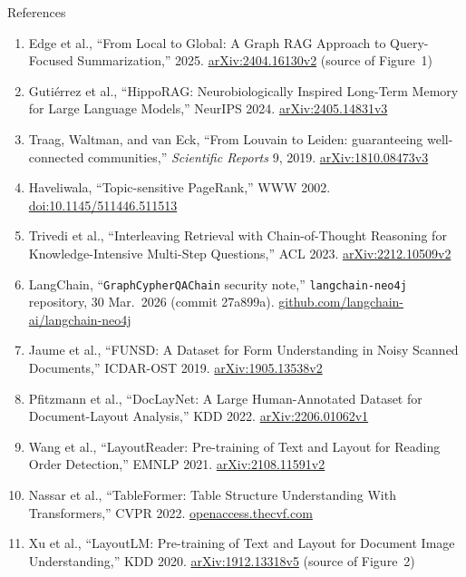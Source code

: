 \begin{frame}[allowframebreaks]{References}
\begin{enumerate}
    \item Edge et al., ``From Local to Global: A Graph RAG Approach to Query-Focused Summarization,'' 2025. \href{https://arxiv.org/abs/2404.16130v2}{arXiv:2404.16130v2} (source of Figure~1)
    \item Guti\'errez et al., ``HippoRAG: Neurobiologically Inspired Long-Term Memory for Large Language Models,'' NeurIPS 2024. \href{https://arxiv.org/abs/2405.14831v3}{arXiv:2405.14831v3}
    \item Traag, Waltman, and van Eck, ``From Louvain to Leiden: guaranteeing well-connected communities,'' \textit{Scientific Reports} 9, 2019. \href{https://arxiv.org/abs/1810.08473v3}{arXiv:1810.08473v3}
    \item Haveliwala, ``Topic-sensitive PageRank,'' WWW 2002. \href{https://doi.org/10.1145/511446.511513}{doi:10.1145/511446.511513}
    \item Trivedi et al., ``Interleaving Retrieval with Chain-of-Thought Reasoning for Knowledge-Intensive Multi-Step Questions,'' ACL 2023. \href{https://arxiv.org/abs/2212.10509v2}{arXiv:2212.10509v2}
    \item LangChain, ``\texttt{GraphCypherQAChain} security note,'' \texttt{langchain-neo4j} repository, 30 Mar.\ 2026 (commit 27a899a). \href{https://github.com/langchain-ai/langchain-neo4j/blob/27a899a1da724968774fcc7cd07734591c57e01d/libs/neo4j/langchain_neo4j/chains/graph_qa/cypher.py}{github.com/langchain-ai/langchain-neo4j}
    \item Jaume et al., ``FUNSD: A Dataset for Form Understanding in Noisy Scanned Documents,'' ICDAR-OST 2019. \href{https://arxiv.org/abs/1905.13538v2}{arXiv:1905.13538v2}
    \item Pfitzmann et al., ``DocLayNet: A Large Human-Annotated Dataset for Document-Layout Analysis,'' KDD 2022. \href{https://arxiv.org/abs/2206.01062v1}{arXiv:2206.01062v1}
    \item Wang et al., ``LayoutReader: Pre-training of Text and Layout for Reading Order Detection,'' EMNLP 2021. \href{https://arxiv.org/abs/2108.11591v2}{arXiv:2108.11591v2}
    \item Nassar et al., ``TableFormer: Table Structure Understanding With Transformers,'' CVPR 2022. \href{https://openaccess.thecvf.com/content/CVPR2022/html/Nassar_TableFormer_Table_Structure_Understanding_With_Transformers_CVPR_2022_paper.html}{openaccess.thecvf.com}
    \item Xu et al., ``LayoutLM: Pre-training of Text and Layout for Document Image Understanding,'' KDD 2020. \href{https://arxiv.org/abs/1912.13318v5}{arXiv:1912.13318v5} (source of Figure~2)

\end{enumerate}
\end{frame}
